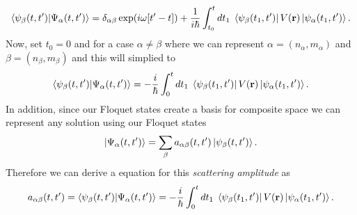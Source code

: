 \begin{equation} \label{4.15}
  \begin{aligned}
    \braket{\psi_{\beta}(t,t')}{\Psi_{\alpha}(t,t')} =
    \delta_{\alpha\beta}\exp(i\omega\qty[t'-t]) +
    \frac{1}{i\hbar}
    \int_{t_0}^t dt_1 \;
    \bra{\psi_{\beta}(t_1,t')}
    V(\mathbf{r}) \ket{\psi_{\alpha}(t_1,t')}.
  \end{aligned}
\end{equation}
Now, set $t_0 = 0$ and for a case $\alpha \neq \beta$ where we can represent $\alpha = (n_{\alpha},m_{\alpha})$ and $\beta = (n_{\beta},m_{\beta})$ and this will simplied to
\begin{equation} \label{4.16}
  \begin{aligned}
    \braket{\psi_{\beta}(t,t')}{\Psi_{\alpha}(t,t')} =
    -
    \frac{i}{\hbar}
    \int_{0}^t dt_1 \;
    \bra{\psi_{\beta}(t_1,t')}
    V(\mathbf{r}) \ket{\psi_{\alpha}(t_1,t')}.
  \end{aligned}
\end{equation}
In addition, since our Floquet states create a basis for composite space we can represent any solution using our Floquet states
\begin{equation} \label{4.17}
  \ket{\Psi_{\alpha}(t,t')} = \sum_{\beta} a_{\alpha\beta}(t,t')
  \ket{\psi_{\beta}(t,t')}.
\end{equation}
Therefore we can derive a equation for this \textit{scattering amplitude} as
\begin{equation} \label{4.18}
  a_{\alpha\beta}(t,t') =
  \braket{\psi_{\beta}(t,t')}{\Psi_{\alpha}(t,t')} =
  -
  \frac{i}{\hbar}
  \int_{0}^t dt_1 \;
  \bra{\psi_{\beta}(t_1,t')}
  V(\mathbf{r}) \ket{\psi_{\alpha}(t_1,t')}.
\end{equation}

